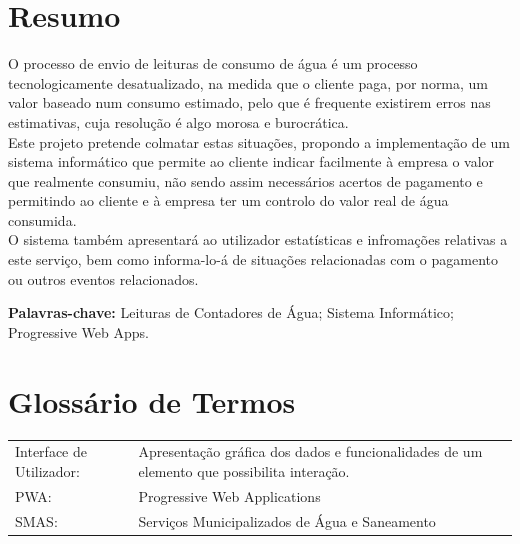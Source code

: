 \documentclass[a4paper,openright,twoside,11pt]{report}
\begin{document}
\chapter*{Resumo}
O processo de envio de leituras de consumo de água é um processo tecnologicamente desatualizado, na medida que o cliente paga, por norma, um valor baseado num consumo estimado, pelo que é frequente existirem erros nas estimativas, cuja resolução é algo morosa e burocrática.\\
Este projeto pretende colmatar estas situações, propondo a implementação de um sistema informático que permite ao cliente indicar facilmente à empresa o valor que realmente consumiu, não sendo assim necessários acertos de pagamento e permitindo ao cliente e à empresa ter um controlo do valor real de água consumida.\\
O sistema também apresentará ao utilizador estatísticas e infromações relativas a este serviço, bem como informa-lo-á de situações relacionadas com o pagamento ou outros eventos relacionados.
\vspace{1.5cm}

{\bf Palavras-chave:} Leituras de Contadores de Água; Sistema Informático; Progressive Web Apps.

\cleardoublepage %
\chapter*{Glossário de Termos}

\begin{tabular}[l]{l  p{11cm}} 

Interface de Utilizador: & Apresentação gráfica dos dados e funcionalidades de um elemento que possibilita interação.\\ 

PWA:  & Progressive Web Applications\\

SMAS: & Serviços Municipalizados de Água e Saneamento\\

\end{tabular}
\label{tab:req_utilizador}

\end{document}
